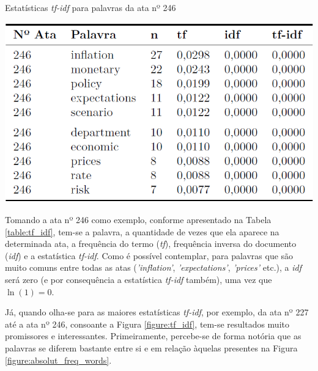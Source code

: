 \begin{table}[hbtp]
	\centering
	\caption{Estatísticas \textit{tf-idf} para palavras da ata nº 246} \label{table:tf_idf}
	\includegraphics[scale = 0.50]{figuras/tabela_tf_idf.PNG}
\end{table}

Tomando a ata nº 246 como exemplo, conforme apresentado na Tabela \ref{table:tf_idf}, tem-se a palavra, a quantidade de vezes que ela aparece na determinada ata, a frequência do termo (\textit{tf}), frequência inversa do documento (\textit{idf}) e a estatística \textit{tf-idf}. Como é possível contemplar, para palavras que são muito comuns entre todas as atas (\textit{'inflation'}, \textit{'expectations'}, \textit{'prices'} etc.), a \textit{idf} será zero (e por consequência a estatística \textit{tf-idf} também), uma vez que $\ln(1) = 0 $.

Já, quando olha-se para as maiores estatísticas \textit{tf-idf}, por exemplo, da ata nº 227 até a ata nº 246, consoante a Figura \ref{figure:tf_idf}, tem-se resultados muito promissores e interessantes. Primeiramente, percebe-se de forma notória que as palavras se diferem bastante entre si e em relação àquelas presentes na Figura \ref{figure:absolut_freq_words}. 

